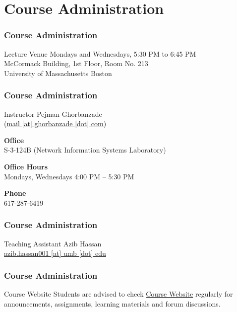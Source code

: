 \documentclass[10pt, compress]{beamer}
\begin{document}
\prepareCover

\section{Course Administration}

\begin{frame}[fragile]
	\frametitle{Course Administration}
	\begin{block}{Lecture Venue}
		Mondays and Wednesdays, 5:30 PM to 6:45 PM\\
		McCormack Building, 1st Floor, Room No. 213\\
		University of Massachusetts Boston
	\end{block}
\end{frame}

\begin{frame}[fragile]
	\frametitle{Course Administration}
	\begin{block}{Instructor}
		Pejman Ghorbanzade\\\href{mailto:mail@ghorbanzade.com}{(mail [at] ghorbanzade [dot] com)}

		\textbf{Office}\\S-3-124B (Network Information Systems Laboratory)

		\textbf{Office Hours}\\Mondays, Wednesdays 4:00 PM -- 5:30 PM

		\textbf{Phone}\\617-287-6419
	\end{block}
\end{frame}

\begin{frame}[fragile]
	\frametitle{Course Administration}
	\begin{block}{Teaching Assistant}
		Azib Hassan\\\href{mailto:azib.hassan001@umb.edu}{azib.hassan001 [at] umb [dot] edu}
	\end{block}
\end{frame}

\begin{frame}
	\frametitle{Course Administration}
	\begin{block}{Course Website}
		Students are advised to check \href{http://www.ghorbanzade.com/teaching/UMB-CS114-2015F}{\alert{Course Website}} regularly for announcements, assignments, learning materials and forum discussions.
	\end{block}
\end{frame}
\end{document}

